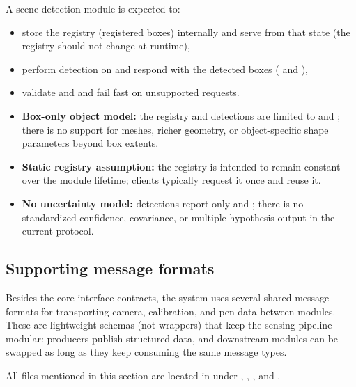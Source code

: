 A scene detection module is expected to:
\begin{itemize}
    \item store the registry (registered boxes) internally and serve  from that state (the registry should not change at runtime),
    \item perform detection on  and respond with the detected boxes ( and ),
    \item validate  and  and fail fast on unsupported requests.
\end{itemize}

\begin{itemize}
    \item \textbf{Box-only object model:} the registry and detections are limited to  and ; there is no support for meshes, richer geometry, or object-specific shape parameters beyond box extents.
    \item \textbf{Static registry assumption:} the registry is intended to remain constant over the module lifetime; clients typically request it once and reuse it.
    \item \textbf{No uncertainty model:} detections report only  and ; there is no standardized confidence, covariance, or multiple-hypothesis output in the current protocol.
\end{itemize}




\subsection{Supporting message formats} \label{sec:ch3_supporting_messages}

Besides the core interface contracts, the system uses several shared message formats for transporting camera, calibration, and pen data between modules. These are lightweight schemas (not wrappers) that keep the sensing pipeline modular: producers publish structured data, and downstream modules can be swapped as long as they keep consuming the same message types.

All files mentioned in this section are located in  under
, , , and .

